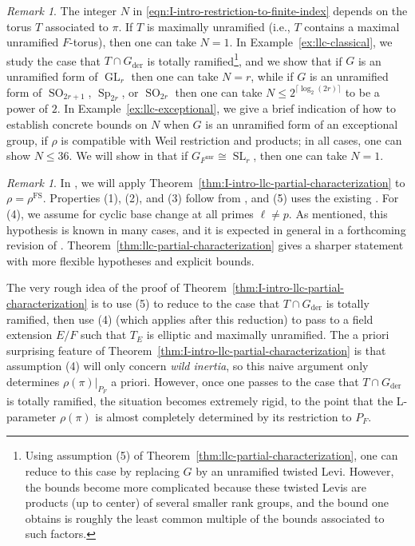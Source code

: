 \documentclass[reqno]{amsart}
\numberwithin{equation}{subsection}
\DeclareMathOperator{\GL}{GL}
\DeclareMathOperator{\SL}{SL}
\DeclareMathOperator{\Sp}{Sp}
\DeclareMathOperator{\SO}{SO}
\DeclareMathOperator{\unr}{unr}
\DeclareMathOperator{\FS}{FS}
\DeclareMathOperator{\der}{der}
\theoremstyle{remark}
\newtheorem{remark}[thm]{Remark}
\numberwithin{equation}{subsection}
\numberwithin{figure}{subsection}
\begin{document}
\begin{remark}The integer $N$ in \eqref{eqn:I-intro-restriction-to-finite-index} depends on the torus $T$ associated to $\pi$. If $T$ is maximally unramified (i.e., $T$ contains a maximal unramified $F$-torus), then one can take $N = 1$. In Example~\ref{ex:llc-classical}, we study the case that $T \cap G_{\der}$ is totally ramified\footnote{Using assumption (5) of Theorem~\ref{thm:llc-partial-characterization}, one can reduce to this case by replacing $G$ by an unramified twisted Levi. However, the bounds become more complicated because these twisted Levis are products (up to center) of several smaller rank groups, and the bound one obtains is roughly the least common multiple of the bounds associated to such factors.}, and we show that if $G$ is an unramified form of $\GL_r$ then one can take $N = r$, while if $G$ is an unramified form of $\SO_{2r+1}$, $\Sp_{2r}$, or $\SO_{2r}$ then one can take $N \leq 2^{\lceil\log_2(2r)\rceil}$ to be a power of $2$. In Example~\ref{ex:llc-exceptional}, we give a brief indication of how to establish concrete bounds on $N$ when $G$ is an unramified form of an exceptional group, if $\rho$ is compatible with Weil restriction and products; in all cases, one can show $N \leq 36$. We will show in \cite[Theorem~10.4.3]{CF26b} that if $G_{F^{\unr}} \cong \SL_r$, then one can take $N = 1$.
\end{remark}

\begin{remark}\label{rem:modular-functoriality-black-box-II}
In \cite{CF26b}, we will apply Theorem~\ref{thm:I-intro-llc-partial-characterization} to $\rho=\rho^{\FS}$. Properties (1), (2), and (3) follow from \cite[Theorem I.9.6(i), (iii), (v)]{FS}, and (5) uses the existing \cite[Theorem 1.3.1]{F24}. For (4), we assume \cite[Hypothesis~4.1.4]{CF26b} for cyclic base change at all primes $\ell \neq p$. As mentioned, this hypothesis is known in many cases, and it is expected in general in a forthcoming revision of \cite{F24}. Theorem~\ref{thm:llc-partial-characterization} gives a sharper statement with more flexible hypotheses and explicit bounds.
\end{remark}

The very rough idea of the proof of Theorem~\ref{thm:I-intro-llc-partial-characterization} is to use (5) to reduce to the case that $T\cap G_{\der}$ is totally ramified, then use (4) (which applies after this reduction) to pass to a field extension $E/F$ such that $T_E$ is elliptic and maximally unramified. The a priori surprising feature of Theorem~\ref{thm:I-intro-llc-partial-characterization} is that assumption (4) will only concern \emph{wild inertia}, so this naive argument only determines $\rho(\pi)|_{P_F}$ a priori. However, once one passes to the case that $T\cap G_{\der}$ is totally ramified, the situation becomes extremely rigid, to the point that the L-parameter $\rho(\pi)$ is almost completely determined by its restriction to $P_F$.
\end{document}
